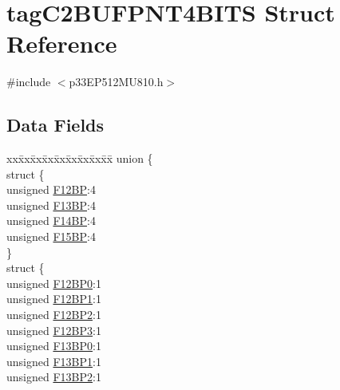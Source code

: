 \hypertarget{structtag_c2_b_u_f_p_n_t4_b_i_t_s}{}\section{tag\+C2\+B\+U\+F\+P\+N\+T4\+B\+I\+TS Struct Reference}
\label{structtag_c2_b_u_f_p_n_t4_b_i_t_s}


{\ttfamily \#include $<$p33\+E\+P512\+M\+U810.\+h$>$}

\subsection*{Data Fields}
\begin{DoxyCompactItemize}
\item 
\begin{tabbing}
xx\=xx\=xx\=xx\=xx\=xx\=xx\=xx\=xx\=\kill
union \{\\
\>struct \{\\
\>\>unsigned \hyperlink{structtag_c2_b_u_f_p_n_t4_b_i_t_s_ad9ddff1645fb1bf9f895271954cee105}{F12BP}:4\\
\>\>unsigned \hyperlink{structtag_c2_b_u_f_p_n_t4_b_i_t_s_a1d3f3c0de6b735e7a30db7e0a63f0199}{F13BP}:4\\
\>\>unsigned \hyperlink{structtag_c2_b_u_f_p_n_t4_b_i_t_s_af5c6bbf85eed696b04f6c46f05cc3815}{F14BP}:4\\
\>\>unsigned \hyperlink{structtag_c2_b_u_f_p_n_t4_b_i_t_s_ae1cc17c8b284c11acdc9aeb18094edb0}{F15BP}:4\\
\>\} \\
\>struct \{\\
\>\>unsigned \hyperlink{structtag_c2_b_u_f_p_n_t4_b_i_t_s_a6ddd8e10455884f29a2c3b95c7851950}{F12BP0}:1\\
\>\>unsigned \hyperlink{structtag_c2_b_u_f_p_n_t4_b_i_t_s_a43c9cf4b4c67e11bb2fd619a00a67a06}{F12BP1}:1\\
\>\>unsigned \hyperlink{structtag_c2_b_u_f_p_n_t4_b_i_t_s_af9be347667f4c90fb10f2c3349c70329}{F12BP2}:1\\
\>\>unsigned \hyperlink{structtag_c2_b_u_f_p_n_t4_b_i_t_s_a2ede2b353cd7d380676c88d0722ed0ec}{F12BP3}:1\\
\>\>unsigned \hyperlink{structtag_c2_b_u_f_p_n_t4_b_i_t_s_adbe0ecb925eacf7133ce0aa9c7da8e0b}{F13BP0}:1\\
\>\>unsigned \hyperlink{structtag_c2_b_u_f_p_n_t4_b_i_t_s_a4ebbfb6ecd1817559d4345358c142f89}{F13BP1}:1\\
\>\>unsigned \hyperlink{structtag_c2_b_u_f_p_n_t4_b_i_t_s_aee8ea24c2cb565ea0d02acbf7dcdc400}{F13BP2}:1\\

\end{tabbing}
\end{DoxyCompactItemize}
